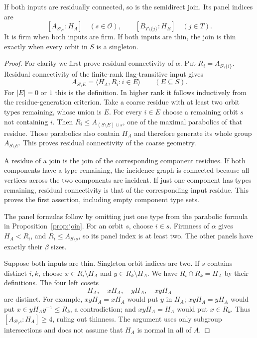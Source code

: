 \begin{proposition}\label{prop:residues}
If both inputs are residually connected, so is the semidirect join.
Its panel indices are
\[
 [A_{S\setminus s}:H_A]\quad(s\in\mathcal O),\qquad
 [B_{T\setminus\{j\}}:H_B]\quad(j\in T).
\]
It is firm when both inputs are firm. If both inputs are thin, the
join is thin exactly when every orbit in $S$ is a singleton.
\end{proposition}
\begin{proof}
For clarity we first prove residual connectivity of
$\overline\alpha$. Put $R_i=A_{S\setminus\{i\}}$.
Residual connectivity of the finite-rank flag-transitive input gives
\[
 A_{S\setminus E}=\langle H_A,R_i:i\in E\rangle
 \qquad(E\subseteq S).
\]
For $|E|=0$ or $1$ this is the definition. In higher rank it follows
inductively from the residue-generation criterion. Take a coarse
residue with at least two orbit types remaining, whose union is $E$.
For every $i\in E$ choose a remaining orbit $s$ not containing $i$.
Then $R_i\leq A_{(S\setminus E)\cup s}$, one of the maximal
parabolics of that residue. Those parabolics also contain $H_A$ and
therefore generate its whole group $A_{S\setminus E}$. This proves
residual connectivity of the coarse geometry.

A residue of a join is the join of the corresponding component
residues. If both components have a type remaining, the incidence
graph is connected because all vertices across the two components
are incident. If just one component has types remaining, residual
connectivity is that of the corresponding input residue. This proves
the first assertion, including empty component type sets.

The panel formulas follow by omitting just one type from the
parabolic formula in Proposition~\ref{prop:join}. For an orbit $s$,
choose $i\in s$. Firmness of $\alpha$ gives $H_A<R_i$, and
$R_i\leq A_{S\setminus s}$, so its panel index is at least two.
The other panels have exactly their $\beta$ sizes.

Suppose both inputs are thin. Singleton orbit indices are two. If
$s$ contains distinct $i,k$, choose $x\in R_i\setminus H_A$ and
$y\in R_k\setminus H_A$. We have $R_i\cap R_k=H_A$ by their
definitions. The four left cosets
\[
 H_A,\quad xH_A,\quad yH_A,\quad xyH_A
\]
are distinct. For example, $xyH_A=xH_A$ would put $y$ in $H_A$;
$xyH_A=yH_A$ would put $x\in yH_Ay^{-1}\leq R_k$, a
contradiction; and $xyH_A=H_A$ would put $x\in R_k$.
Thus $[A_{S\setminus s}:H_A]\geq4$, ruling out thinness.
The argument uses only subgroup intersections and does not assume
that $H_A$ is normal in all of $A$.
\end{proof}

